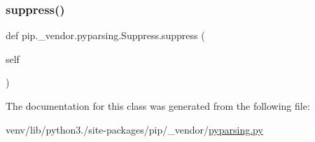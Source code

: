 \subsubsection{\texorpdfstring{suppress()}{suppress()}}
{\footnotesize\ttfamily def pip.\+\_\+vendor.\+pyparsing.\+Suppress.\+suppress (\begin{DoxyParamCaption}\item[{}]{self }\end{DoxyParamCaption})}



The documentation for this class was generated from the following file\+:\begin{DoxyCompactItemize}
\item 
venv/lib/python3./site-\/packages/pip/\+\_\+vendor/\hyperlink{pip_2__vendor_2pyparsing_8py}{pyparsing.\+py}\end{DoxyCompactItemize}
